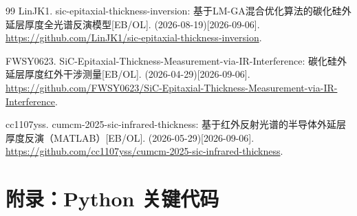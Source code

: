 \documentclass[11pt,a4paper,fontset=fandol]{ctexart}
\begin{document}
\begin{thebibliography}{99}
     LinJK1. sic-epitaxial-thickness-inversion: 基于LM-GA混合优化算法的碳化硅外延层厚度全光谱反演模型[EB/OL]. (2026-08-19)[2026-09-06]. \url{https://github.com/LinJK1/sic-epitaxial-thickness-inversion}.

     FWSY0623. SiC-Epitaxial-Thickness-Measurement-via-IR-Interference: 碳化硅外延层厚度红外干涉测量[EB/OL]. (2026-04-29)[2026-09-06]. \url{https://github.com/FWSY0623/SiC-Epitaxial-Thickness-Measurement-via-IR-Interference}.

     cc1107yss. cumcm-2025-sic-infrared-thickness: 基于红外反射光谱的半导体外延层厚度反演（MATLAB）[EB/OL]. (2026-05-29)[2026-09-06]. \url{https://github.com/cc1107yss/cumcm-2025-sic-infrared-thickness}.

\end{thebibliography}

\newpage
\appendix
\section{附录：Python 关键代码}
\end{document}
